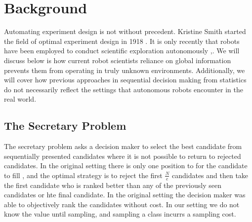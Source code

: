 \section{Background}
\label{sec:background}

Automating experiment design is not without precedent.  Kristine Smith started the field of optimal experiment design in 1918 \cite{smith1918standard}.
It is only recently that robots have been employed to conduct scientific exploration autonomously \cite{wagner2001science},\cite{king2004functional}.  We will discuss below is how current robot scientists reliance on global information prevents them from operating in truly unknown environments.  Additionally, we will cover how previous approaches in sequential decision making from statistics do not necessarily reflect the settings that autonomous robots encounter in the real world.


\subsection{The Secretary Problem}

The secretary problem asks a decision maker to select the best candidate from
sequentially presented candidates where it is not possible to return to
rejected candidates.  In the original setting there is only one
position to for the candidate to fill \cite{ferguson1989solved}, and the
optimal strategy is to reject the first $\frac{N}{e}$ candidates and then take
the first candidate who is ranked better than any of the previously seen
candidates or hte final candidate.  In the original setting the decision maker
was able to objectively rank the candidates without cost.  In our setting we do not know the value until sampling, and sampling a class incurrs a sampling cost.


